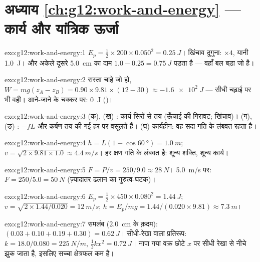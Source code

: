 \section*{अध्याय \ref{ch:g12:work-and-energy} --- कार्य और यांत्रिक ऊर्जा}

\begin{solution}{exo:g12:work-and-energy:1}
$E_p = \tfrac12 \times 200 \times 0.050^2 = \qty{0.25}{J}$। खिंचाव दुगुना: $\times 4$, यानी \qty{1.0}{J}। और अकेले दूसरे \qty{5.0}{cm} का दाम $1.0 - 0.25 = \qty{0.75}{J}$
पड़ता है --- वहाँ बल बड़ा जो है।
\end{solution}

\begin{solution}{exo:g12:work-and-energy:2}
रास्ता चाहे जो हो, $W = mg(z_A - z_B) = 0.90 \times 9.81 \times (12 - 30) \approx
\qty{-1.6e2}{J}$ --- सीधी चढ़ाई पर भी वही। आने-जाने के चक्कर पर:
\qty{0}{J} ()।
\end{solution}

\begin{solution}{exo:g12:work-and-energy:3}
(क), (ख) : कार्य सिरों से तय (ऊँचाई की गिरावट; खिंचाव)।
(ग), (ङ) : $-fL$ और कर्षण तय की गई हर  पर वसूलते
हैं। (घ) कार्यहीन: वह सदा गति के लंबवत रहता है।
\end{solution}

\begin{solution}{exo:g12:work-and-energy:4}
$h = L(1 - \cos\qty{60}{\degree}) = \qty{1.0}{m}$; $v = \sqrt{2 \times 9.81 \times 1.0} \approx \qty{4.4}{m/s}$।  हर क्षण गति के लंबवत है: शून्य शक्ति,
शून्य कार्य।
\end{solution}

\begin{solution}{exo:g12:work-and-energy:5}
$F = P/v = 250/9.0 \approx \qty{28}{N}$। \qty{5.0}{m/s} पर: $F = 250/5.0 = \qty{50}{N}$ (ज़्यादातर ढलान का गुरुत्व-घटक)।
\end{solution}

\begin{solution}{exo:g12:work-and-energy:6}
$E_p = \tfrac12 \times 450 \times 0.080^2 = \qty{1.44}{J}$; $v = \sqrt{2 \times 1.44/0.020} = \qty{12}{m/s}$; $h = E_p/mg = 1.44/(0.020 \times 9.81) \approx \qty{7.3}{m}$।
\end{solution}

\begin{solution}{exo:g12:work-and-energy:7}
समलंब (\qty{2.0}{cm} के क़दम): $(0.03 + 0.10 + 0.19 + 0.30) =
\qty{0.62}{J}$। सीधी-रेखा वाला प्रतिरूप: $k = 18.0/0.080 =
\qty{225}{N/m}$, $\tfrac12 kx^2 = \qty{0.72}{J}$। नापा
गया वक्र छोटे $x$ पर सीधी रेखा से नीचे झुक जाता है, इसलिए सच्चा क्षेत्रफल
कम है।
\end{solution}

